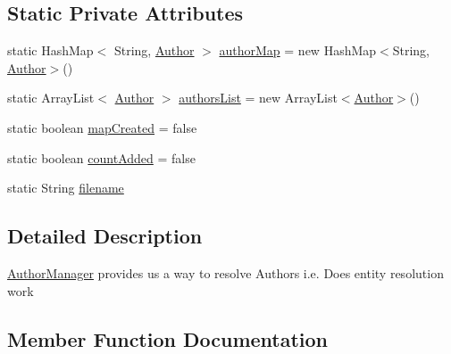\subsection*{Static Private Attributes}
\begin{DoxyCompactItemize}
\item 
static Hash\+Map$<$ String, \hyperlink{classAuthor}{Author} $>$ \hyperlink{classAuthorManager_a0adde1702d5fc9ec68f403848dee10a6}{author\+Map} = new Hash\+Map$<$String, \hyperlink{classAuthor}{Author}$>$()
\item 
static Array\+List$<$ \hyperlink{classAuthor}{Author} $>$ \hyperlink{classAuthorManager_a16d40e3ce8111e6d3a8eccf786b1e6c8}{authors\+List} = new Array\+List$<$\hyperlink{classAuthor}{Author}$>$()
\item 
static boolean \hyperlink{classAuthorManager_a8007cf90e289ab4af6178566708969bc}{map\+Created} = false
\item 
static boolean \hyperlink{classAuthorManager_a5d91f1fb549ce31ad9cfcb2d6fc38817}{count\+Added} = false
\item 
static String \hyperlink{classAuthorManager_ab51e8e8b1326d63e88c21d56a9ea631a}{filename}
\end{DoxyCompactItemize}


\subsection{Detailed Description}
\hyperlink{classAuthorManager}{Author\+Manager} provides us a way to resolve Authors i.\+e. Does entity resolution work 

\subsection{Member Function Documentation}

